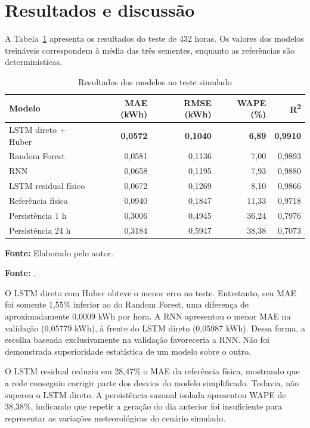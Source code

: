 \section{Resultados e discussão}
A Tabela~\ref{tab:res} apresenta os resultados do teste de 432 horas. Os valores dos modelos treináveis correspondem à média das três sementes, enquanto as referências são determinísticas.
\begin{table}[!ht]\centering\caption{Resultados dos modelos no teste simulado}\label{tab:res}\small
\begin{tabular}{@{}lrrrr@{}}\toprule
Modelo & MAE (kWh) & RMSE (kWh) & WAPE (\%) & R\textsuperscript{2}\\\midrule
LSTM direto + Huber & \textbf{0,0572} & \textbf{0,1040} & \textbf{6,89} & \textbf{0,9910}\\
Random Forest & 0,0581 & 0,1136 & 7,00 & 0,9893\\
RNN & 0,0658 & 0,1195 & 7,93 & 0,9880\\
LSTM residual físico & 0,0672 & 0,1269 & 8,10 & 0,9866\\
Referência física & 0,0940 & 0,1847 & 11,33 & 0,9718\\
Persistência 1 h & 0,3006 & 0,4945 & 36,24 & 0,7976\\
Persistência 24 h & 0,3184 & 0,5947 & 38,38 & 0,7073\\\bottomrule
\end{tabular}
\par\smallskip\footnotesize \textbf{Fonte:} Elaborado pelo autor.
\end{table}

\textbf{Fonte:} .

O LSTM direto com Huber obteve o menor erro no teste. Entretanto, seu MAE foi somente 1,55\% inferior ao do Random Forest, uma diferença de aproximadamente 0,0009 kWh por hora. A RNN apresentou o menor MAE na validação (0,05779 kWh), à frente do LSTM direto (0,05987 kWh). Dessa forma, a escolha baseada exclusivamente na validação favoreceria a RNN. Não foi demonstrada superioridade estatística de um modelo sobre o outro.

O LSTM residual reduziu em 28,47\% o MAE da referência física, mostrando que a rede conseguiu corrigir parte dos desvios do modelo simplificado. Todavia, não superou o LSTM direto. A persistência sazonal isolada apresentou WAPE de 38,38\%, indicando que repetir a geração do dia anterior foi insuficiente para representar as variações meteorológicas do cenário simulado.

